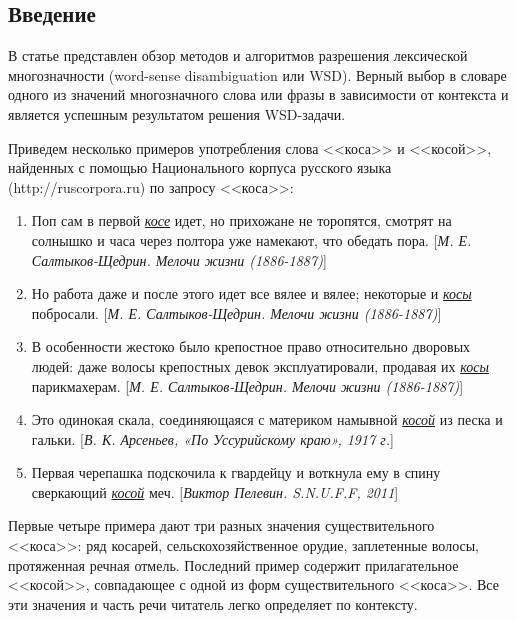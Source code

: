 \documentclass{article}
\begin{document}

\maketitle

\begin{articletext}

\section{Введение}
В статье представлен обзор методов и алгоритмов разрешения лексической многозначности (word-sense disambiguation или WSD). Верный выбор в словаре одного из значений многозначного слова или фразы в зависимости от контекста и является успешным результатом решения WSD-задачи.

Приведем несколько примеров употребления слова <<коса>> и <<косой>>, найденных с помощью Национального корпуса русского языка (http://ruscorpora.ru) по запросу <<коса>>:

\begin{enumerate}
\item Поп сам в первой \textit{\underline{косе}} идет, но прихожане не торопятся, смотрят на солнышко и часа через полтора уже намекают, что обедать пора. {\footnotesize[\textit{М. Е. Салтыков-Щедрин. Мелочи жизни (1886-1887)}]}
\item Но работа даже и после этого идет все вялее и вялее; некоторые и \textit{\underline{косы}} побросали. {\footnotesize[\textit{М. Е. Салтыков-Щедрин. Мелочи жизни (1886-1887)}]}
\item В особенности жестоко было крепостное право относительно дворовых людей: даже волосы крепостных девок эксплуатировали, продавая их \textit{\underline{косы}} парикмахерам. {\footnotesize[\textit{М. Е. Салтыков-Щедрин. Мелочи жизни (1886-1887)}]}
\item Это одинокая скала, соединяющаяся с материком намывной \textit{\underline{косой}} из песка и гальки. {\footnotesize[\textit{В. К. Арсеньев, «По Уссурийскому краю», 1917 г.}]}
\item Первая черепашка подскочила к гвардейцу и воткнула ему в спину сверкающий \textit{\underline{косой}} меч. {\footnotesize[\textit{Виктор Пелевин. S.N.U.F.F, 2011}]}
\end{enumerate}

Первые четыре примера дают три разных значения существительного <<коса>>: ряд косарей, сельскохозяйственное орудие, заплетенные волосы, протяженная речная отмель. Последний пример содержит прилагательное <<косой>>, совпадающее с одной из форм существительного <<коса>>. Все эти значения и часть речи читатель легко определяет по контексту. 


\end{articletext}
\end{document}
